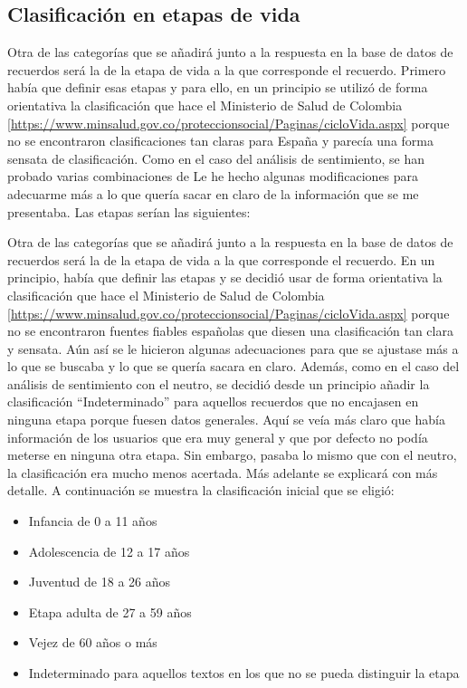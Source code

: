 \subsection{Clasificación en etapas de vida}

Otra de las categorías que se añadirá junto a la respuesta en la base de datos de recuerdos será la de la etapa de vida a la que corresponde el recuerdo. Primero había que definir esas etapas y para ello, en un principio se utilizó de forma orientativa la clasificación que hace el Ministerio de Salud de Colombia \ref{https://www.minsalud.gov.co/proteccionsocial/Paginas/cicloVida.aspx} porque no se encontraron clasificaciones tan claras para España y parecía una forma sensata de clasificación. Como en el caso del análisis de sentimiento, se han probado varias combinaciones de Le he hecho algunas modificaciones para adecuarme más a lo que quería sacar en claro de la información que se me presentaba. Las etapas serían las siguientes:

Otra de las categorías que se añadirá junto a la respuesta en la base de datos de recuerdos será la de la etapa de vida a la que corresponde el recuerdo. En un principio, había que definir las etapas y se decidió usar de forma orientativa la clasificación que hace el Ministerio de Salud de Colombia \ref{https://www.minsalud.gov.co/proteccionsocial/Paginas/cicloVida.aspx} porque no se encontraron fuentes fiables españolas que diesen una clasificación tan clara y sensata. Aún así se le hicieron algunas adecuaciones para que se ajustase más a lo que se buscaba y lo que se quería sacara en claro. Además, como en el caso del análisis de sentimiento con el neutro, se decidió desde un principio añadir la clasificación ``Indeterminado'' para aquellos recuerdos que no encajasen en ninguna etapa porque fuesen datos generales. Aquí se veía más claro que había información de los usuarios que era muy general y que por defecto no podía meterse en ninguna otra etapa. Sin embargo, pasaba lo mismo que con el neutro, la clasificación era mucho menos acertada. Más adelante se explicará con más detalle. A continuación se muestra la clasificación inicial que se eligió:

\begin{itemize}
	\item Infancia de 0 a 11 años
	\item Adolescencia de 12 a 17 años
	\item Juventud de 18 a 26 años
	\item Etapa adulta de 27 a 59 años
	\item Vejez de 60 años o más
	\item Indeterminado para aquellos textos en los que no se pueda distinguir la etapa
\end{itemize}


